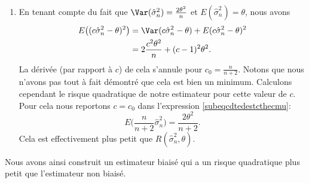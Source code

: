 \begin{example}
\begin{enumerate}
        \item
            En tenant compte du fait que \( \Var(\hat\sigma_n^2)=\frac{ 2\theta^2 }{ n }\) et \( E(\hat\sigma_n^2)=\theta\), nous avons
            \begin{subequations}
                \begin{align}
                    E\big( (c\hat\sigma_n^2-\theta)^2 \big)&=\Var(c\hat\sigma_n^2-\theta)+E(c\hat\sigma_n^2-\theta)^2\\
                    &=2\frac{ c^2\theta^2 }{ n }+(c-1)^2\theta^2.   \label{subeqcdtedestcthecmu}
                \end{align}
            \end{subequations}
            La dérivée (par rapport à \( c\)) de cela s'annule pour \( c_0=\frac{ n }{ n+2 }\). Notons que nous n'avons pas tout à fait démontré que cela est bien un minimum. Calculons cependant le risque quadratique de notre estimateur pour cette valeur de \( c\). Pour cela nous reportons \( c=c_0\) dans l'expression \eqref{subeqcdtedestcthecmu}:
            \begin{equation}
                E\big( \frac{ n }{ n+2 }\hat\sigma_n^2 \big)=\frac{ 2\theta^2 }{ n+2 }.
            \end{equation}
            Cela est effectivement plus petit que \( R(\hat\sigma_n^2,\theta)\).
    \end{enumerate}
    Nous avons ainsi construit un estimateur biaisé qui a un risque quadratique plus petit que l'estimateur non biaisé.
\end{example}

